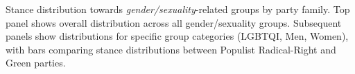 Stance distribution towards \emph{gender/sexuality}-related groups by party family. Top panel shows overall distribution across all gender/sexuality groups. Subsequent panels show distributions for specific group categories (LGBTQI, Men, Women), with bars comparing stance distributions between Populist Radical-Right and Green parties.